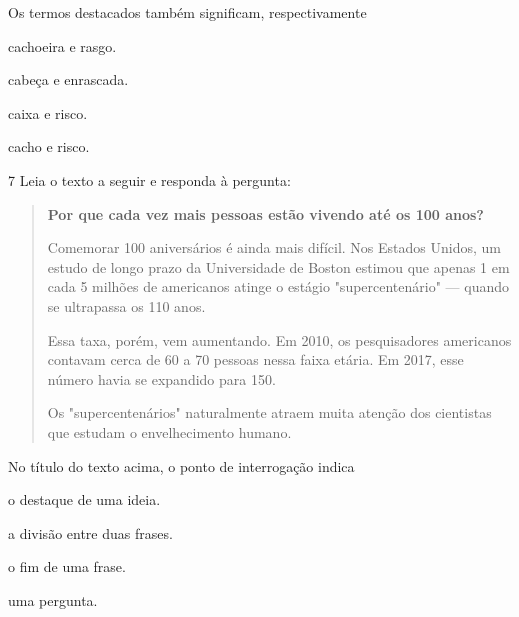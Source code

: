 Os termos destacados também significam, respectivamente

\begin{escolha}
\item cachoeira e rasgo.

\item cabeça e enrascada.

\item caixa e risco.

\item cacho e risco.
\end{escolha}


\num{7} Leia o texto a seguir e responda à pergunta:

\begin{quote}
\textbf{Por que cada vez mais pessoas estão vivendo até os 100 anos?}

Comemorar 100 aniversários é ainda mais difícil. Nos Estados Unidos,
um estudo de longo prazo da Universidade de Boston estimou que apenas 1
em cada 5 milhões de americanos atinge o estágio "supercentenário" ---
quando se ultrapassa os 110 anos.

Essa taxa, porém, vem aumentando. Em 2010, os pesquisadores americanos
contavam cerca de 60 a 70 pessoas nessa faixa etária. Em 2017, esse
número havia se expandido para 150.

Os "supercentenários" naturalmente atraem muita atenção dos cientistas
que estudam o envelhecimento humano.

\end{quote}

No título do texto acima, o ponto de interrogação indica

\begin{escolha}
\item o destaque de uma ideia.

\item a divisão entre duas frases.

\item o fim de uma frase.

\item uma pergunta.
\end{escolha}

